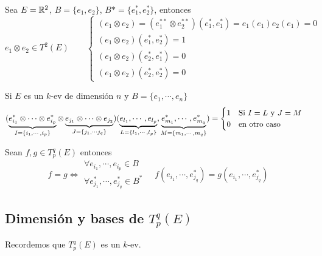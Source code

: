 \begin{example}
	Sea $E = \mathbb{R}^2$, $B = \{e_1, e_2\}$, $B* = \{e_1^*, e_2^*\}$, entonces
	\[
		e_1 \otimes e_2 \in T^2(E) \qquad \begin{cases}
			(e_1 \otimes e_2) = (e_1^{**} \otimes e_2^{**})(e_1^*,e_1^*) =
			e_1(e_1)e_2(e_1) = 0 \\
			(e_1 \otimes e_2)(e_1^*,e_2^*) = 1 \\
			(e_1 \otimes e_2)(e_2^*,e_1^*) = 0 \\
			(e_1 \otimes e_2)(e_2^*,e_2^*) = 0
		\end{cases}
	\]
\end{example}
\begin{obs}[a] \label{obs:tens_cero}
	Si $E$ es un $k$-ev de dimensión $n$ y $B = \{e_1, \cdots, e_n\}$
	\[
		(\underbrace{e_{i_1}^* \otimes \cdots \otimes e_{i_p}^*}_
		{I = \{i_1, \cdots, i_p\}} \otimes
		\underbrace{e_{j_1} \otimes \cdots \otimes e_{j_2}}_
		{J = \{j_1, \cdots j_q\}})(\underbrace{e_{l_1}, \cdots, e_{l_p}}_
		{L = \{l_1, \cdots, l_p\}}, \underbrace{e_{m_1}^*, \cdots, e_{m_q}^*}_
		{M = \{m_1, \cdots, m_q\}}) =
		\begin{cases}
			1 \quad \text{Si } I = L \text{ y } J = M \\
			0 \quad \text{en otro caso}
		\end{cases}
	\]
\end{obs}
\begin{obs}
	Sean $f,g \in T_p^q(E)$ entonces
	\[
		f=g \iff \substack{\forall e_{i_1}, \cdots, e_{i_p} \in B \\ \forall e_{j_1}^*, \cdots,
		e_{j_q}^* \in B^*} \quad f(e_{i_1}, \cdots, e_{j_q}^*) =
		g(e_{i_1}, \cdots, e_{j_q}^*)
	\]
\end{obs}

\subsection{Dimensión y bases de $T_p^q(E)$}

Recordemos que $T_p^q(E)$ es un $k$-ev.

